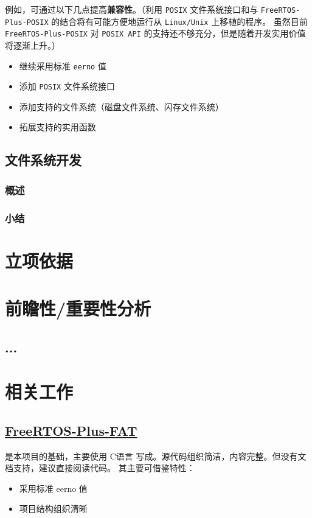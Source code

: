 \documentclass[a4paper]{article}
\begin{document}
例如，可通过以下几点提高\textbf{兼容性}。（利用 \texttt{POSIX} 文件系统接口和与 \texttt{FreeRTOS-Plus-POSIX} 的结合将有可能方便地运行从 \texttt{Linux/Unix} 上移植的程序。
虽然目前 \texttt{FreeRTOS-Plus-POSIX} 对 \texttt{POSIX API} 的支持还不够充分，但是随着开发实用价值将逐渐上升。）

\begin{itemize}
    \item 继续采用标准 \texttt{eerno} 值
    \item 添加 \texttt{POSIX} 文件系统接口
    \item 添加支持的文件系统（磁盘文件系统、闪存文件系统）
    \item 拓展支持的实用函数
\end{itemize}

\subsection{文件系统开发}
\subsubsection{概述}
\subsubsection{小结}

\section{立项依据}



\section{前瞻性/重要性分析}
\subsection{...}
\section{相关工作}
\subsection{\href{https://www.freertos.org/zh-cn-cmn-s/FreeRTOS-Plus/FreeRTOS_Plus_FAT/index.html}{FreeRTOS-Plus-FAT}}
是本项目的基础，主要使用 C语言 写成。源代码组织简洁，内容完整。但没有文档支持，建议直接阅读代码。
其主要可借鉴特性：
\begin{itemize}
    \item 采用标准 eerno 值
    \item 项目结构组织清晰
\end{itemize}
\end{document}
